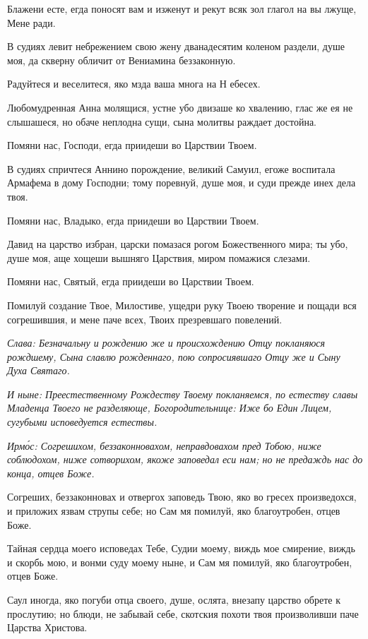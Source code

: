 Блажени есте, егда поносят вам и изженут и рекут всяк зол глагол на вы лжуще, Мене ради.

В судиях левит небрежением свою жену дванадесятим коленом раздели, душе моя, да скверну обличит от Вениамина беззаконную.

Радуйтеся и веселитеся, яко мзда ваша многа на Н ебесех.

Любомудренная Анна молящися, устне убо двизаше ко хвалению, глас же ея не слышашеся, но обаче неплодна сущи, сына молитвы раждает достойна.

Помяни нас, Господи, егда приидеши во Царствии Твоем.

В судиях спричтеся Аннино порождение, великий Самуил, егоже воспитала Армафема в дому Господни; тому поревнуй, душе моя, и суди прежде инех дела твоя.

Помяни нас, Владыко, егда приидеши во Царствии Твоем.

Давид на царство избран, царски помазася рогом Божественного мира; ты убо, душе моя, аще хощеши вышняго Царствия, миром помажися слезами.

Помяни нас, Святый, егда приидеши во Царствии Твоем.

Помилуй создание Твое, Милостиве, ущедри руку Твоею творение и пощади вся согрешившия, и мене паче всех, Твоих презревшаго повелений.

\itshape Слава\normalfont{}: Безначальну и рождению же и происхождению Отцу покланяюся рождшему, Сына славлю рожденнаго, пою сопросиявшаго Отцу же и Сыну Духа Святаго.

\itshape И ныне\normalfont{}: Преестественному Рождеству Твоему покланяемся, по естеству славы Младенца Твоего не разделяюще, Богородительнице: Иже бо Един Лицем, сугубыми исповедуется естествы. 


\itshape Ирм\'{о}с\normalfont{}: Согрешихом, беззаконновахом, неправдовахом пред Тобою, ниже соблюдохом, ниже сотворихом, якоже заповедал еси нам; но не предаждь нас до конца, отцев Боже.

Согреших, беззаконновах и отвергох заповедь Твою, яко во гресех произведохся, и приложих язвам струпы себе; но Сам мя помилуй, яко благоутробен, отцев Боже.

Тайная сердца моего исповедах Тебе, Судии моему, виждь мое смирение, виждь и скорбь мою, и вонми суду моему ныне, и Сам мя помилуй, яко благоутробен, отцев Боже.

Саул иногда, яко погуби отца своего, душе, ослята, внезапу царство обрете к прослутию; но блюди, не забывай себе, скотския похоти твоя произволивши паче Царства Христова.

